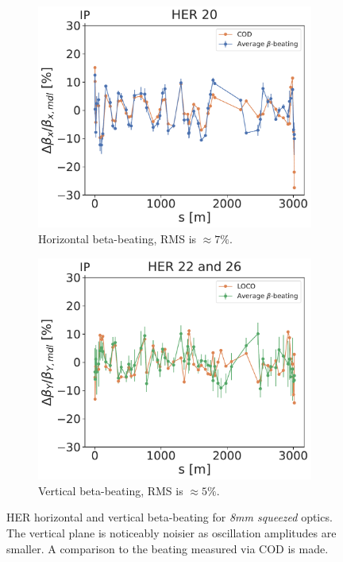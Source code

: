 \begin{figure}[!htb]
    \centering
    \begin{subfigure}[b]{0.48\textwidth}
        \includegraphics[width=\linewidth]{images/kek/her_20_bet_x_unzoomed.pdf}
        \caption{Horizontal beta-beating, RMS is $\approx 7\%$.}
    \end{subfigure}
    \hfill
    \begin{subfigure}[b]{0.48\textwidth}
        \includegraphics[width=\linewidth]{images/kek/her_22_26_bet_y_unzoomed.pdf}
        \caption{Vertical beta-beating, RMS is $\approx 5\%$.}
    \end{subfigure}
    \caption{HER horizontal and vertical beta-beating for \textit{8mm squeezed} optics. The vertical
    plane is noticeably noisier as oscillation amplitudes are smaller. A comparison to the beating
    measured via COD is made.}
    \label{fig:kek:beating_her_squeezed}
\end{figure}

